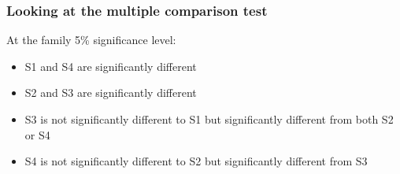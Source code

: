 \begin{frame}\frametitle{Looking at the multiple comparison test}
At the family 5\% significance level:
\begin{itemize}
\item S1 and S4 are significantly different
\item S2 and S3 are significantly different
\item S3 is not significantly different to S1 but significantly different
      from both S2 or S4
\item S4 is not significantly different to S2 but significantly different
      from S3
\end{itemize}
\end{frame}


